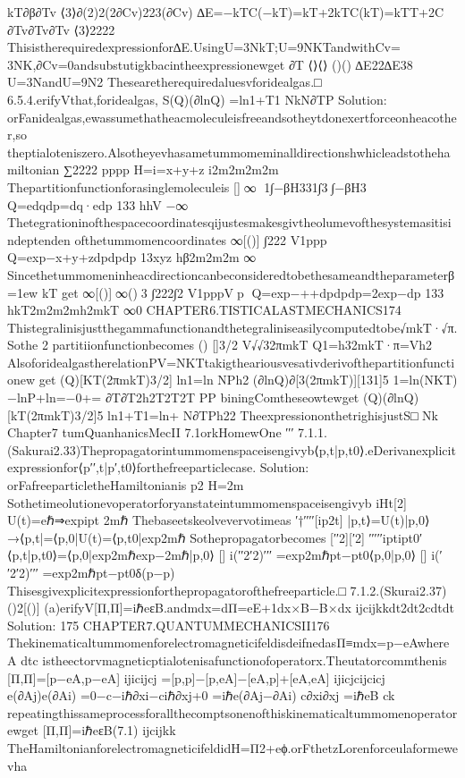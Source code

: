 {{{{{{{{{{kT∂β∂Tv
⟨3⟩∂(2)2(2∂Cv)223(∂Cv)
∆E=−kTC(−kT)=kT+2kTC(kT)=kTT+2C
∂Tv∂Tv∂Tv
⟨3⟩2222
Thisistherequiredexpressionfor∆E.UsingU=3NkT;U=9NKTandwithCv=
3NK,∂Cv=0andsubstutigkbacintheexpressionewget
∂T
⟨⟩⟨⟩
()()
∆E22∆E38
U=3NandU=9N2
Thesearetherequiredaluesvforidealgas.□
6.5.4.erifyVthat,foridealgas,
S(Q)(∂lnQ)
=ln1+T1
NkN∂TP
Solution:
orFanidealgas,ewassumethatheacmoleculeisfreeandsotheytdonexertforceonheacother,so
theptialoteniszero.Alsotheyevhasametummomeminalldirectionshwhicleadstothehamiltonian
∑2222
pppp
H=i=x+y+z
i2m2m2m2m
Thepartitionfunctionforasinglemoleculeis
[]∞
1∫−βH331∫3∫−βH3
Q=edqdp=dq·edp
133
hhV
−∞
Thetegrationinofthespacecoordinatesqijustesmakesgivtheolumevofthesystemasitisindeptenden
ofthetummomencoordinates
∞[()]
∫222
V1ppp
Q=exp−x+y+zdpdpdp
13xyz
hβ2m2m2m
∞
Sincethetummomeninheacdirectioncanbeconsideredtobethesameandtheparameterβ=1ew
kT
get
∞[()]∞()3
∫222∫2
V1pppVp
Q=exp−++dpdpdp=2exp−dp
133
hkT2m2m2mh2mkT
∞0
CHAPTER6.TISTICALASTMECHANICS174
Thistegralinisjustthegammafunctionandthetegraliniseasilycomputedtobe√mkT·√π.Sothe
2
partitiionfunctionbecomes
()
[]3/2
V√√32πmkT
Q1=h32mkT·π=Vh2
AlsoforidealgastherelationPV=NKTtakigtheariousvesativderivofthepartitionfunctionew
get
(Q)[KT(2πmkT)3/2]
ln1=ln
NPh2
(∂lnQ)∂[3(2πmkT)][131]5
1=ln(NKT)−lnP+ln=−0+=
∂T∂T2h2T2T2T
PP
biningComtheseowtewget
(Q)(∂lnQ)[kT(2πmkT)3/2]5
ln1+T1=ln+
N∂TPh22
TheexpressiononthetrighisjustS□
Nk
Chapter7
tumQuanhanicsMecII
7.1orkHomewOne
′′′
7.1.1.(Sakurai2.33)Thepropagatorintummomenspaceisengivyb⟨p,t|p,t0⟩.eDerivanexplicit
expressionfor⟨p′′,t|p′,t0⟩forthefreeparticlecase.
Solution:
orFafreeparticletheHamiltonianis
p2
H=2m
Sothetimeolutionevoperatorforyanstateintummomenspaceisengivyb
iHt[2]
U(t)=eℏ⇒expipt
2mℏ
Thebaseetskeolvevervotimeas
′†′′′′[ip2t]
|p,t⟩=U(t)|p,0⟩→⟨p,t|=⟨p,0|U(t)=⟨p,t0|exp2mℏ
Sothepropagatorbecomes
[′′2][′2]
′′′′′iptipt0′
⟨p,t|p,t0⟩=⟨p,0|exp2mℏexp−2mℏ|p,0⟩
[]
i(′′2′2)′′′
=exp2mℏpt−pt0⟨p,0|p,0⟩
[]
i(′′2′2)′′′
=exp2mℏpt−pt0δ(p−p)
Thisesgivexplicitexpressionforthepropagatorofthefreeparticle.□
7.1.2.(Skurai2.37)
()2[()]
(a)erifyV[Π,Π]=iℏeεB.andmdx=dΠ=eE+1dx×B−B×dx
ijcijkkdt2dt2cdtdt
Solution:
175
CHAPTER7.QUANTUMMECHANICSII176
ThekinematicaltummomenforelectromagneticifeldisdeifnedasΠ≡mdx=p−eAwhereA
dtc
istheectorvmagneticptialotenisafunctionofoperatorx.Theutatorcommthenis
[Π,Π]=[p−eA,p−eA]
ijicijcj
=[p,p]−[p,eA]−[eA,p]+[eA,eA]
ijicjcijcicj
e(∂Aj)e(∂Ai)
=0−c−iℏ∂xi−ciℏ∂xj+0
=iℏe(∂Aj−∂Ai)
c∂xi∂xj
=iℏeB
ck
repeatingthissameprocessforallthecomptsonenofthiskinematicaltummomenoperatorewget
[Π,Π]=iℏeεB(7.1)
ijcijkk
TheHamiltonianforelectromagneticifeldidH=Π2+eϕ.orFthetzLorenforceulaformewevha
}}}}}}}}}}
